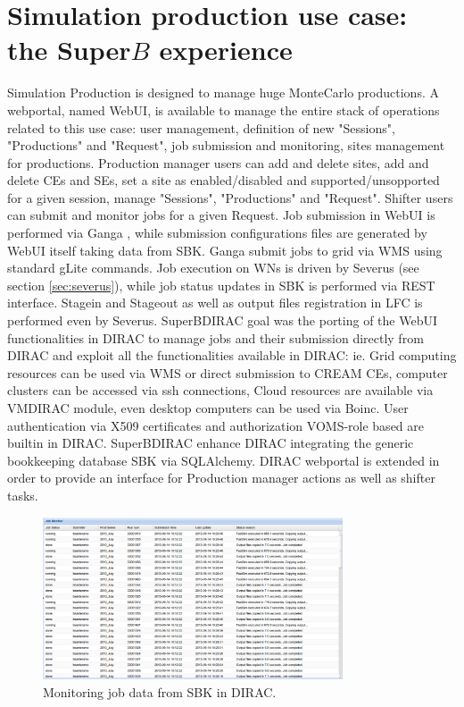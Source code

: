 \documentclass[journal]{IEEEtran}
\begin{document}
\section{Simulation production use case: the Super$B$ experience}
Simulation Production is designed to manage huge MonteCarlo productions.
A webportal, named WebUI\cite{ref:webui}, is available to manage the entire stack of operations related to this use case: user management, definition of new "Sessions", "Productions" and "Request", job submission and monitoring, sites management for productions. 
Production manager users can add and delete sites, add and delete CEs and SEs, set a site as enabled/disabled and supported/unsopported for a given session, manage "Sessions", "Productions" and "Request".
Shifter users can submit and monitor jobs for a given Request. Job submission in WebUI is performed via Ganga%
, while submission configurations files are generated by WebUI itself taking data from SBK. Ganga submit jobs to grid via WMS using standard gLite commands. Job execution on WNs is driven by Severus (see section \ref{sec:severus}), while job status updates in SBK is performed via REST interface. Stagein and Stageout as well as output files registration in LFC is performed even by Severus. %
SuperBDIRAC goal was the porting of the WebUI functionalities in DIRAC to manage jobs and their submission directly from DIRAC and exploit all the functionalities available in DIRAC: ie. Grid computing resources can be used via WMS or direct submission to CREAM CEs, computer clusters can be accessed via ssh connections, Cloud resources are available via VMDIRAC module, even desktop computers can be used via Boinc. User authentication via X509 certificates and authorization VOMS-role based are builtin in DIRAC.
SuperBDIRAC enhance DIRAC integrating the generic bookkeeping database SBK via SQLAlchemy.
DIRAC webportal is extended in order to provide an interface for Production manager actions as well as shifter tasks.

\begin{figure}[!h]
\centering
\includegraphics[width=3.5in]{SuperBDIRAC_monitoring.eps}
\caption{Monitoring job data from SBK in DIRAC.}
\label{fig:superbdirac_monitoring}
\end{figure}
\end{document}
